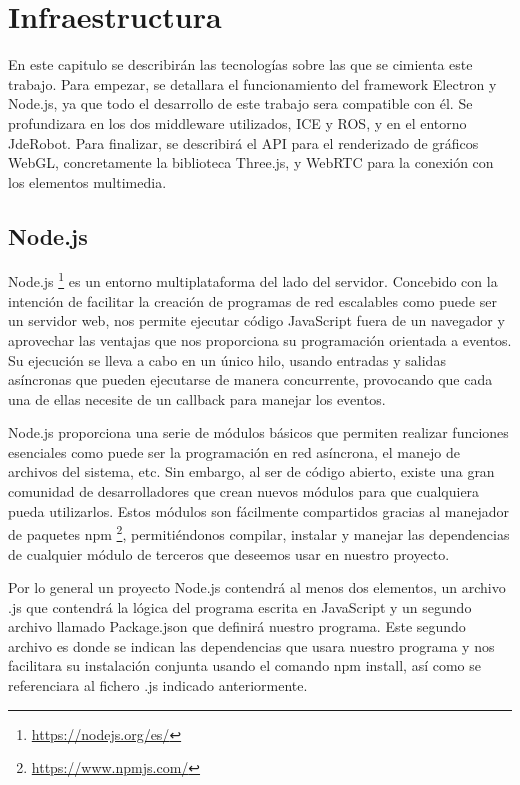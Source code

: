 \chapter{Infraestructura}\label{cap.infraestructura}
En este capitulo se describirán las tecnologías sobre las que se cimienta este trabajo. Para empezar, se detallara el funcionamiento del framework Electron y Node.js, ya que todo el desarrollo de este trabajo sera compatible con él. Se profundizara en los dos middleware utilizados, ICE y ROS, y en el entorno JdeRobot. Para finalizar, se describirá el API para el renderizado de gráficos WebGL, concretamente la biblioteca Three.js, y WebRTC para la conexión con los elementos multimedia.

\section{Node.js}
Node.js \footnote{\url{https://nodejs.org/es/}} es un entorno multiplataforma del lado del servidor. Concebido con la intención de facilitar la creación de programas de red escalables como puede ser un servidor web, nos permite ejecutar código JavaScript fuera de un navegador y aprovechar las ventajas que nos proporciona su programación orientada a eventos. Su ejecución se lleva a cabo en un único hilo, usando entradas y salidas asíncronas que pueden ejecutarse de manera concurrente, provocando que cada una de ellas necesite de un callback para manejar los eventos. 

Node.js proporciona una serie de módulos básicos que permiten realizar funciones esenciales como puede ser la programación en red asíncrona, el manejo de archivos del sistema, etc. Sin embargo, al ser de código abierto, existe una gran comunidad de desarrolladores que crean nuevos módulos para que cualquiera pueda utilizarlos. Estos módulos son fácilmente compartidos gracias al manejador de paquetes npm \footnote{\url{https://www.npmjs.com/}}, permitiéndonos compilar, instalar y manejar las dependencias de cualquier módulo de terceros que deseemos usar en nuestro proyecto.
 
Por lo general un proyecto Node.js contendrá al menos dos elementos, un archivo .js que contendrá la lógica del programa escrita en JavaScript y un segundo archivo llamado Package.json que definirá nuestro programa. Este segundo archivo es donde se indican las dependencias que usara nuestro programa y nos facilitara su instalación conjunta usando el comando npm install, así como se referenciara al fichero .js indicado anteriormente.

